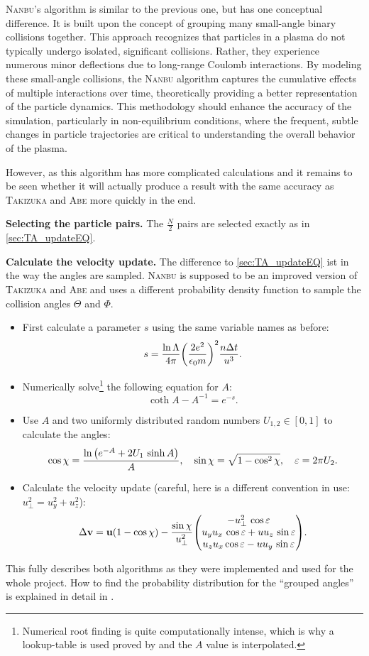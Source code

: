 \textsc{Nanbu}'s algorithm is similar to the previous one, but has one conceptual difference. It is built upon the concept of grouping many small-angle binary collisions together. This approach recognizes that particles in a plasma do not typically undergo isolated, significant collisions. Rather, they experience numerous minor deflections due to long-range Coulomb interactions. By modeling these small-angle collisions, the \textsc{Nanbu} algorithm captures the cumulative effects of multiple interactions over time, theoretically providing a better representation of the particle dynamics. This methodology should enhance the accuracy of the simulation, particularly in non-equilibrium conditions, where the frequent, subtle changes in particle trajectories are critical to understanding the overall behavior of the plasma. 

However, as this algorithm has more complicated calculations and it remains to be seen whether it will actually produce a result with the same accuracy as \textsc{Takizuka} and \textsc{Abe} more quickly in the end.

\textbf{Selecting the particle pairs.} The $\frac{N}{2}$ pairs are selected exactly as in \ref{sec:TA_updateEQ}.

\textbf{Calculate the velocity update.} The difference to \ref{sec:TA_updateEQ} ist in the way the angles are sampled. \textsc{Nanbu} is supposed to be an improved version of \textsc{Takizuka} and \textsc{Abe} and uses a different probability density function to sample the collision angles $\Theta$ and $\Phi$.
\begin{itemize}
    \item First calculate a parameter $s$ using the same variable names as before:
    $$
    s = \frac{\ln\Lambda}{4\pi} \qty(\frac{2 e^2}{\epsilon_0 m})^2 \frac{n \Delta t}{u^3} .
    $$
    \item Numerically solve\footnote{Numerical root finding is quite computationally intense, which is why a lookup-table is used proved by \cite[4644]{Nanbu1997} and the $A$ value is interpolated.} the following equation for $A$:
    $$
    \coth A - A^{-1} = e^{-s} .
    $$
    \item Use $A$ and two uniformly distributed random numbers $U_{1,2} \in [0, 1]$ to calculate the angles:
    $$
    \cos\chi = \frac{\ln\qty(e^{-A} + 2 U_1 \, \sinh A)}{A}, 
    \quad\sin\chi = \sqrt{1 - \cos^2\chi},
    \quad\varepsilon = 2\pi U_2 .
    $$
    \item Calculate the velocity update (careful, here is a different convention in use: $u_\perp^2 = u_y^2+u_z^2$): 
    $$
    \Delta \mathbf{v} =  \mathbf{u} \qty(1 - \cos\chi) - \frac{\sin\chi}{u_\perp^2} \mqty(-u_\perp^2 \, \cos\varepsilon \\ u_yu_x\,\cos\varepsilon + uu_z \,\sin\varepsilon \\ u_zu_x \cos\varepsilon - uu_y \,\sin\varepsilon) .
    $$
\end{itemize}
This fully describes both algorithms as they were implemented and used for the whole project. How to find the probability distribution for the ``grouped angles'' is explained in detail in \cite[4644]{Nanbu1997}.


